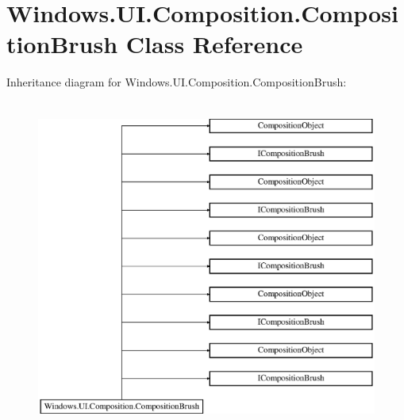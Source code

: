 \hypertarget{class_windows_1_1_u_i_1_1_composition_1_1_composition_brush}{}\section{Windows.\+U\+I.\+Composition.\+Composition\+Brush Class Reference}
\label{class_windows_1_1_u_i_1_1_composition_1_1_composition_brush}
Inheritance diagram for Windows.\+U\+I.\+Composition.\+Composition\+Brush\+:\begin{figure}[H]
\begin{center}
\leavevmode
\includegraphics[height=11.000000cm]{class_windows_1_1_u_i_1_1_composition_1_1_composition_brush}
\end{center}
\end{figure}
